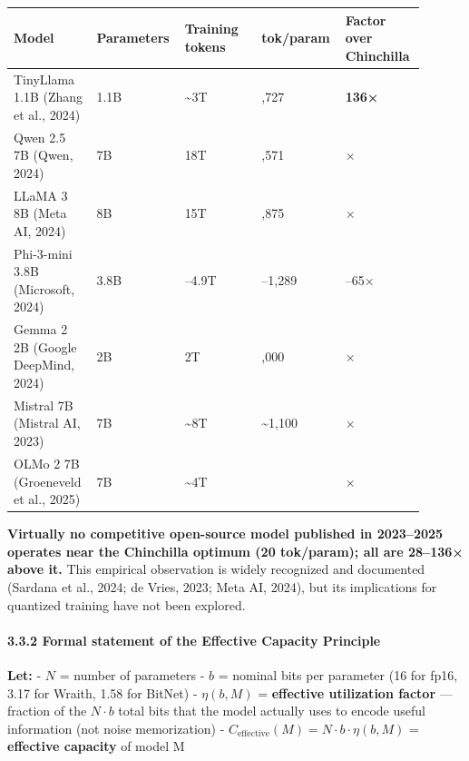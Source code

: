 {\def\LTcaptype{none} %
{\footnotesize\setlength{\tabcolsep}{3pt}
\begin{longtable}[]{@{}>{\raggedright\arraybackslash}p{0.180\linewidth}>{\raggedright\arraybackslash}p{0.180\linewidth}>{\raggedright\arraybackslash}p{0.180\linewidth}>{\raggedright\arraybackslash}p{0.180\linewidth}>{\raggedright\arraybackslash}p{0.180\linewidth}@{}}
\toprule\noalign{}
Model & Parameters & Training tokens & tok/param & Factor over Chinchilla \\
\midrule\noalign{}
\endhead
\bottomrule\noalign{}
\endlastfoot
TinyLlama 1.1B (Zhang et al., 2024) & 1.1B & \textasciitilde3T & 2,727 &
\textbf{136×} \\
Qwen 2.5 7B (Qwen, 2024) & 7B & 18T & 2,571 & 129× \\
LLaMA 3 8B (Meta AI, 2024) & 8B & 15T & 1,875 & 94× \\
Phi-3-mini 3.8B (Microsoft, 2024) & 3.8B & 3.3--4.9T & 868--1,289 &
43--65× \\
Gemma 2 2B (Google DeepMind, 2024) & 2B & 2T & 1,000 & 50× \\
Mistral 7B (Mistral AI, 2023) & 7B & \textasciitilde8T &
\textasciitilde1,100 & 55× \\
OLMo 2 7B (Groeneveld et al., 2025) & 7B & \textasciitilde4T & 557 &
28× \\
\end{longtable}
}
}

\textbf{Virtually no competitive open-source model published in
2023--2025 operates near the Chinchilla optimum (20 tok/param); all are
28--136× above it.} This empirical observation is widely recognized and
documented (Sardana et al., 2024; de Vries, 2023; Meta AI, 2024), but
its implications for quantized training have not been explored.

\paragraph{3.3.2 Formal statement of the Effective Capacity
Principle}\label{formal-statement-of-the-effective-capacity-principle}

\textbf{Let:} - \(N\) = number of parameters - \(b\) = nominal bits per
parameter (16 for fp16, 3.17 for Wraith, 1.58 for BitNet) -
\(\eta(b, M)\) = \textbf{effective utilization factor} --- fraction of
the \(N \cdot b\) total bits that the model actually uses to encode
useful information (not noise memorization) -
\(C_\text{effective}(M) = N \cdot b \cdot \eta(b, M)\) =
\textbf{effective capacity} of model M

